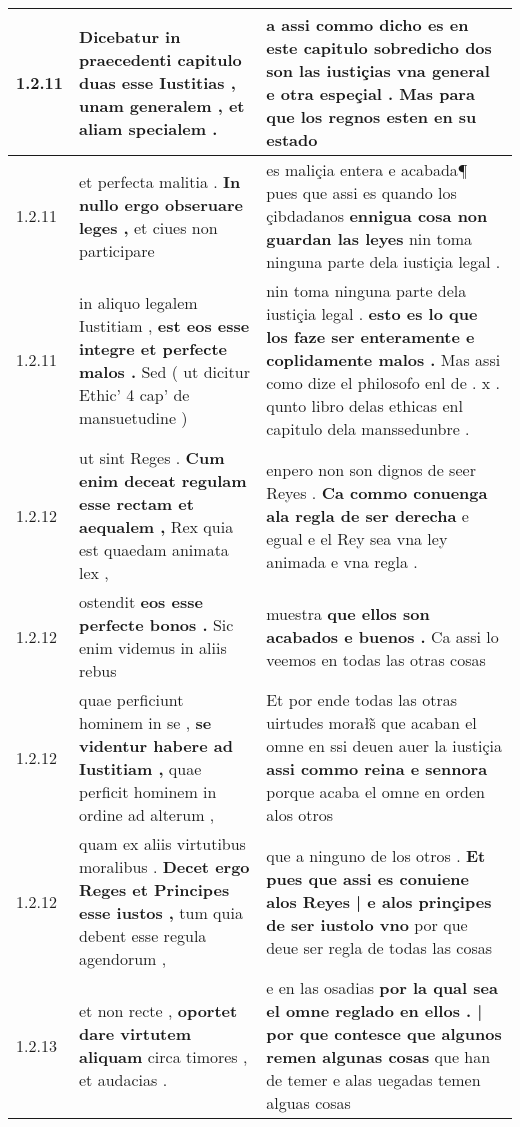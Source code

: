 \begin{tabular}{|p{1cm}|p{6.5cm}|p{6.5cm}|}
1.2.11 & Dicebatur in praecedenti capitulo \textbf{ duas esse Iustitias , } unam generalem , et aliam specialem . & a assi commo dicho es en este capitulo \textbf{ sobredicho dos son las iustiçias vna general e otra espeçial . } Mas para que los regnos esten en su estado \\\hline
1.2.11 & et perfecta malitia . \textbf{ In nullo ergo obseruare leges , } et ciues non participare & es maliçia entera e acabada¶ pues que assi es quando los çibdadanos \textbf{ ennigua cosa non guardan las leyes } nin toma ninguna parte dela iustiçia legal . \\\hline
1.2.11 & in aliquo legalem Iustitiam , \textbf{ est eos esse integre et perfecte malos . } Sed ( ut dicitur Ethic’ 4 cap’ de mansuetudine ) & nin toma ninguna parte dela iustiçia legal . \textbf{ esto es lo que los faze ser enteramente e coplidamente malos . } Mas assi como dize el philosofo enl de . x . qunto libro delas ethicas enl capitulo dela manssedunbre . \\\hline
1.2.12 & ut sint Reges . \textbf{ Cum enim deceat regulam esse rectam et aequalem , } Rex quia est quaedam animata lex , & enpero non son dignos de seer Reyes . \textbf{ Ca commo conuenga ala regla de ser derecha } e egual e el Rey sea vna ley animada e vna regla . \\\hline
1.2.12 & ostendit \textbf{ eos esse perfecte bonos . } Sic enim videmus in aliis rebus & muestra \textbf{ que ellos son acabados e buenos . } Ca assi lo veemos en todas las otras cosas \\\hline
1.2.12 & quae perficiunt hominem in se , \textbf{ se videntur habere ad Iustitiam , } quae perficit hominem in ordine ad alterum , & Et por ende todas las otras uirtudes morałs̃ que acaban el omne en ssi deuen auer la iustiçia \textbf{ assi commo reina e sennora } porque acaba el omne en orden alos otros \\\hline
1.2.12 & quam ex aliis virtutibus moralibus . \textbf{ Decet ergo Reges et Principes esse iustos , } tum quia debent esse regula agendorum , & que a ninguno de los otros . \textbf{ Et pues que assi es conuiene alos Reyes | e alos prinçipes de ser iustolo vno } por que deue ser regla de todas las cosas \\\hline
1.2.13 & et non recte , \textbf{ oportet dare virtutem aliquam } circa timores , et audacias . & e en las osadias \textbf{ por la qual sea el omne reglado en ellos . | por que contesce que algunos remen algunas cosas } que han de temer e alas uegadas temen alguas cosas \\\hline

\end{tabular}
